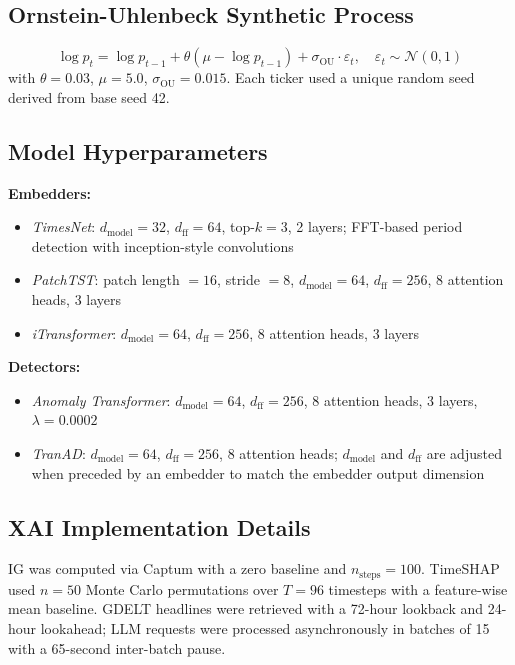 \documentclass{llncs}
\begin{document}
\subsection*{Ornstein-Uhlenbeck Synthetic Process}

\begin{equation}
\log p_t = \log p_{t-1} + \theta(\mu - \log p_{t-1}) + \sigma_{\mathrm{OU}} \cdot \varepsilon_t, \quad \varepsilon_t \sim \mathcal{N}(0,1)
\end{equation}
with $\theta = 0.03$, $\mu = 5.0$, $\sigma_{\mathrm{OU}} = 0.015$. Each ticker used a unique random seed derived from base seed 42.

\subsection*{Model Hyperparameters}

\textbf{Embedders:}
\begin{itemize}
    \item \textit{TimesNet}: $d_\text{model}{=}32$, $d_\text{ff}{=}64$, top-$k{=}3$, 2 layers; FFT-based period detection with inception-style convolutions
    \item \textit{PatchTST}: patch length $= 16$, stride $= 8$, $d_\text{model}{=}64$, $d_\text{ff}{=}256$, 8 attention heads, 3 layers
    \item \textit{iTransformer}: $d_\text{model}{=}64$, $d_\text{ff}{=}256$, 8 attention heads, 3 layers
\end{itemize}

\textbf{Detectors:}
\begin{itemize}
    \item \textit{Anomaly Transformer}: $d_\text{model}{=}64$, $d_\text{ff}{=}256$, 8 attention heads, 3 layers, $\lambda{=}0.0002$
    \item \textit{TranAD}: $d_\text{model}{=}64$, $d_\text{ff}{=}256$, 8 attention heads; $d_\text{model}$ and $d_\text{ff}$ are adjusted when preceded by an embedder to match the embedder output dimension
\end{itemize}

\subsection*{XAI Implementation Details}

IG was computed via Captum with a zero baseline and $n_{\text{steps}} = 100$. TimeSHAP used $n = 50$ Monte Carlo permutations over $T = 96$ timesteps with a feature-wise mean baseline. GDELT headlines were retrieved with a 72-hour lookback and 24-hour lookahead; LLM requests were processed asynchronously in batches of 15 with a 65-second inter-batch pause.
\end{document}
